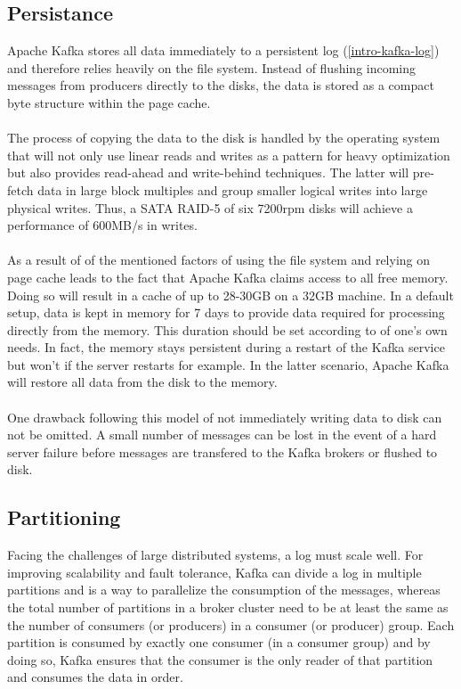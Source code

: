 \subsection{Persistance}
\label{kafka-persistence}
Apache Kafka stores all data immediately to a persistent log
(\ref{intro-kafka-log}) 
and therefore relies heavily on the \gls{file system}.
Instead of flushing incoming messages from producers directly to the disks, the
data is stored as a compact byte structure within the \gls{page cache}.
\\ \\
The process of copying the data to the disk is handled by the operating system
that will not only use linear reads and writes  as a pattern for heavy
optimization but also provides read-ahead and write-behind techniques.
The latter will pre-fetch data in large block multiples and group smaller logical
writes into large physical writes. Thus, a SATA RAID-5 of six 7200rpm
disks will achieve a performance of 600MB/s in writes.
\\ \\
As a result of of the mentioned factors of using the file system and relying on
\gls{page cache} leads to the fact that Apache Kafka claims access to all free memory.
Doing so will result in a cache of up to 28-30GB on a 32GB machine. In a default
setup, data is kept in memory for 7 days to provide data required for processing
directly from the memory. This duration should be set according to of one's own
needs. In fact, the memory stays persistent during a restart of the Kafka
service but won't if the server restarts for example. In the latter scenario,
Apache Kafka will restore all data from the disk to the memory.
\cite{apachekafka} \\ \\
One drawback following this model of not immediately writing data to disk can not be
omitted. A small number of messages can be lost in the event of a hard server
failure before messages are transfered to the Kafka brokers or flushed to disk.
\cite{goodhope2012building}

\subsection{Partitioning}
\label{kafka-partitioning}
Facing the challenges of large distributed systems, a log must scale well. For
improving scalability and fault tolerance, Kafka can divide a log in multiple
partitions and is a way to parallelize the consumption of the messages, whereas
the total number of partitions in a broker cluster need to be at least the same
as the number of consumers (or producers) in a consumer (or producer) group.
Each partition is consumed by exactly one consumer (in a consumer group) and by
doing so, Kafka ensures that the consumer is the only reader of that partition
and consumes the data in order.

